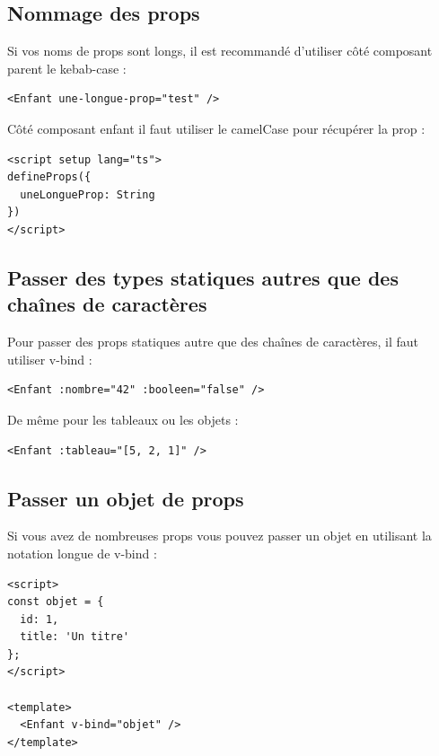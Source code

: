 \documentclass{article}
\begin{document}
\subsection{Nommage des {\color{monOrange}props}}
Si vos noms de {\color{monOrange}props} sont longs, il est recommandé d'utiliser côté composant parent le {\color{monOrange}kebab-case} :
\begin{verbatim}
<Enfant une-longue-prop="test" />
\end{verbatim}
Côté composant enfant il faut utiliser le {\color{monOrange}camelCase} pour récupérer la {\color{monOrange}prop} :
\begin{verbatim}
<script setup lang="ts">
defineProps({
  uneLongueProp: String
})
</script>
\end{verbatim}

\subsection{Passer des types statiques autres que des chaînes de caractères}
Pour passer des {\color{monOrange}props} statiques autre que des chaînes de caractères, il faut utiliser {\color{monOrange}v-bind} :
\begin{verbatim}
<Enfant :nombre="42" :booleen="false" />
\end{verbatim}
De même pour les tableaux ou les objets :
\begin{verbatim}
<Enfant :tableau="[5, 2, 1]" />
\end{verbatim}

\subsection{Passer un objet de {\color{monOrange}props}}
Si vous avez de nombreuses {\color{monOrange}props} vous pouvez passer un objet en utilisant la notation longue de {\color{monOrange}v-bind} :
\begin{verbatim}
<script>
const objet = {
  id: 1,
  title: 'Un titre'
};
</script>

<template>
  <Enfant v-bind="objet" />
</template>
\end{verbatim}
\end{document}
